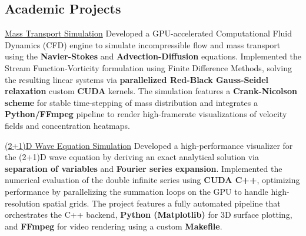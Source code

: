 \documentclass[final,a4paper,10pt,onecolumn]{article}
\begin{document}
\begin{cvmain}
\section{Academic Projects}

\projentry
    {\href{https://github.com/mflagga/cuda-cfd-solver}{Mass Transport Simulation}}
    {
        Developed a GPU-accelerated Computational Fluid Dynamics (CFD) engine to simulate incompressible flow and mass transport using the \textbf{Navier-Stokes} and \textbf{Advection-Diffusion} equations. 
        Implemented the Stream Function-Vorticity formulation using Finite Difference Methods, solving the resulting linear systems via \textbf{parallelized Red-Black Gauss-Seidel relaxation} custom \textbf{CUDA} kernels. 
        The simulation features a \textbf{Crank-Nicolson scheme} for stable time-stepping of mass distribution and integrates a \textbf{Python/FFmpeg} pipeline to render high-framerate visualizations of velocity fields and concentration heatmaps.
    }

\projentry
    {\href{https://github.com/mflagga/wave-vis}{(2+1)D Wave Equation Simulation}}
    {
        Developed a high-performance visualizer for the (2+1)D wave equation by deriving an exact analytical solution via \textbf{separation of variables} and \textbf{Fourier series expansion}. 
        Implemented the numerical evaluation of the double infinite series using \textbf{CUDA C++}, optimizing performance by parallelizing the summation loops on the GPU to handle high-resolution spatial grids. 
        The project features a fully automated pipeline that orchestrates the C++ backend, \textbf{Python (Matplotlib)} for 3D surface plotting, and \textbf{FFmpeg} for video rendering using a custom \textbf{Makefile}.
    }

\end{cvmain}
\end{document}
